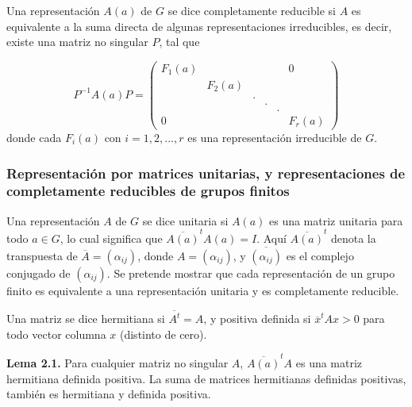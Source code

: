 \documentclass[12pt]{book}
\theoremstyle{definition}
\newcounter{in}
\newcounter{ini}
\begin{document}
Una representación $A\left(a\right)$ de $G$ se dice completamente
reducible si $A$ es equivalente a la suma directa de algunas
representaciones irreducibles, es decir, existe una matriz no singular
$P$, tal que

\begin{equation*}
 P^{-1}A\left(a\right)P=
 \begin{pmatrix}
   F_{1} \left(a\right) & & & & & 0\\
   & F_{2} \left(a\right) & & & & \\
   & & . & & & \\
   & & & . & & \\
   & & & & . & \\
   0 & & & & & F_{r} \left(a\right)
 \end{pmatrix}
\end{equation*}
donde cada $F_{i}\left(a\right)$ con $i=1,2,...,r$ es una
representación irreducible de $G$.

\subsubsection{Representación por matrices unitarias, y
  representaciones de completamente reducibles de grupos finitos}
Una representación $A$ de $G$ se dice unitaria si $A\left(a\right)$ es
una matriz unitaria para todo $a \in G$, lo cual significa que
$\overline{A\left(a\right)}^{t}A\left(a\right)=I$. Aquí
$\overline{A\left(a\right)}^{t}$ denota la transpuesta de
$\overline{A}=\left(\alpha_{ij}\right)$, donde
$A=\left(\alpha_{ij}\right)$, y $\overline{\left(\alpha_{ij}\right)}$
es el complejo conjugado de $\left(\alpha_{ij}\right)$. Se pretende
mostrar que cada representación de un grupo finito es equivalente a
una representación unitaria y es completamente reducible.

Una matriz se dice hermitiana si $\overline{A^{t}}=A$, y positiva
definida si $\overline{x}^{t}Ax>0$ para todo vector columna $x$
(distinto de cero).

\textbf{Lema 2.1.} Para cualquier matriz no singular $A$,
$\overline{A\left(a\right)}^{t}A$ es una matriz hermitiana definida
positiva. La suma de matrices hermitianas definidas positivas, también
es hermitiana y definida positiva.
\end{document}
